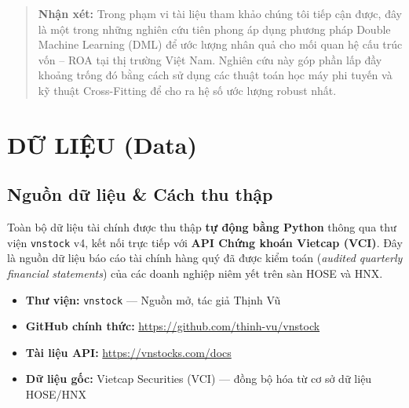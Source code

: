 \documentclass[12pt,a4paper]{article}
\begin{document}
\begin{table}[htbp]
\centering
\caption{Vị trí của nghiên cứu này trong tài liệu hiện có}
\label{tab:lit_review}
\end{table}

\begin{quote}
\textbf{Nhận xét:} Trong phạm vi tài liệu tham khảo chúng tôi tiếp cận được, đây là một trong những nghiên cứu tiên phong áp dụng phương pháp Double Machine Learning (DML) để ước lượng nhân quả cho mối quan hệ cấu trúc vốn -- ROA tại thị trường Việt Nam. Nghiên cứu này góp phần lấp đầy khoảng trống đó bằng cách sử dụng các thuật toán học máy phi tuyến và kỹ thuật Cross-Fitting để cho ra hệ số ước lượng robust nhất.
\end{quote}

\section{DỮ LIỆU (Data)}

\subsection{Nguồn dữ liệu \& Cách thu thập}
Toàn bộ dữ liệu tài chính được thu thập \textbf{tự động bằng Python} thông qua thư viện \texttt{vnstock} v4, kết nối trực tiếp với \textbf{API Chứng khoán Vietcap (VCI)}. Đây là nguồn dữ liệu báo cáo tài chính hàng quý đã được kiểm toán (\textit{audited quarterly financial statements}) của các doanh nghiệp niêm yết trên sàn HOSE và HNX.
\begin{itemize}
    \item \textbf{Thư viện:} \texttt{vnstock} --- Nguồn mở, tác giả Thịnh Vũ
    \item \textbf{GitHub chính thức:} \url{https://github.com/thinh-vu/vnstock}
    \item \textbf{Tài liệu API:} \url{https://vnstocks.com/docs}
    \item \textbf{Dữ liệu gốc:} Vietcap Securities (VCI) --- đồng bộ hóa từ cơ sở dữ liệu HOSE/HNX
\end{itemize}
\end{document}

